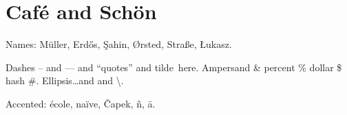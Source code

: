 \documentclass{article}
\begin{document}
\section{Caf\'e and Sch\"on}
Names: M\"uller, Erd\H{o}s, \c{S}ahin, {\O}rsted, Stra{\ss}e, \L{}ukasz.

Dashes -- and --- and ``quotes'' and tilde~here. Ampersand \& percent \% dollar \$ hash \#.
Ellipsis\ldots and \textendash{} and \textbackslash.

Accented: \'{e}cole, na\"{i}ve, \v{C}apek, \~n, \={a}.
\end{document}
